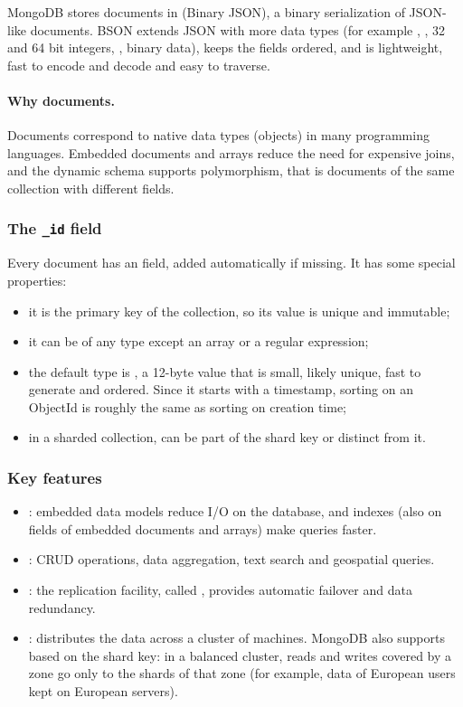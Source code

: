 MongoDB stores documents in  (Binary JSON), a binary serialization of JSON-like documents. BSON extends JSON with more data types (for example , , 32 and 64 bit integers, , binary data), keeps the fields ordered, and is lightweight, fast to encode and decode and easy to traverse.

\paragraph{Why documents.} Documents correspond to native data types (objects) in many programming languages. Embedded documents and arrays reduce the need for expensive joins, and the dynamic schema supports polymorphism, that is documents of the same collection with different fields.

\subsubsection{The \texttt{\_id} field}
Every document has an  field, added automatically if missing. It has some special properties:
\begin{itemize}
  \item it is the primary key of the collection, so its value is unique and immutable;
  \item it can be of any type except an array or a regular expression;
  \item the default type is , a 12-byte value that is small, likely unique, fast to generate and ordered. Since it starts with a timestamp, sorting on an ObjectId is roughly the same as sorting on creation time;
  \item in a sharded collection,  can be part of the shard key or distinct from it.
\end{itemize}

\subsubsection{Key features}
\begin{itemize}
  \item {}: embedded data models reduce I/O on the database, and indexes (also on fields of embedded documents and arrays) make queries faster.
  \item {}: CRUD operations, data aggregation, text search and geospatial queries.
  \item {}: the replication facility, called , provides automatic failover and data redundancy.
  \item {}:  distributes the data across a cluster of machines. MongoDB also supports  based on the shard key: in a balanced cluster, reads and writes covered by a zone go only to the shards of that zone (for example, data of European users kept on European servers).
\end{itemize}

